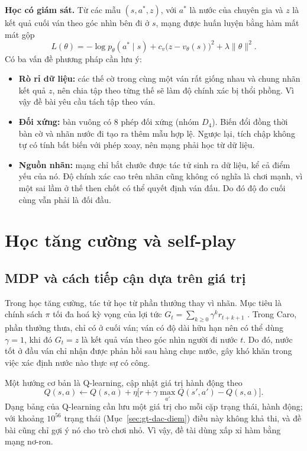 \textbf{Học có giám sát.} Từ các mẫu $(s, a^*, z)$, với $a^*$ là nước của chuyên gia và $z$ là kết quả cuối ván theo góc nhìn bên đi ở $s$, mạng được huấn luyện bằng hàm mất mát gộp
\begin{equation}
  L(\theta) = -\log p_\theta(a^* \mid s) + c_v \big( z - v_\theta(s) \big)^2 + \lambda \| \theta \|^2.
  \label{eq:sl-loss}
\end{equation}
Có ba vấn đề phương pháp cần lưu ý:
\begin{itemize}
  \item \textbf{Rò rỉ dữ liệu:} các thế cờ trong cùng một ván rất giống nhau và chung nhãn kết quả $z$, nên chia tập theo từng thế sẽ làm độ chính xác bị thổi phồng. Vì vậy đề bài yêu cầu tách tập theo ván.
  \item \textbf{Đối xứng:} bàn vuông có 8 phép đối xứng (nhóm $D_4$). Biến đổi đồng thời bàn cờ và nhãn nước đi tạo ra thêm mẫu hợp lệ. Ngược lại, tích chập không tự có tính bất biến với phép xoay, nên mạng phải học từ dữ liệu.
  \item \textbf{Nguồn nhãn:} mạng chỉ bắt chước được tác tử sinh ra dữ liệu, kể cả điểm yếu của nó. Độ chính xác cao trên nhãn cũng không có nghĩa là chơi mạnh, vì một sai lầm ở thế then chốt có thể quyết định ván đấu. Do đó độ đo cuối cùng vẫn phải là đối đầu.
\end{itemize}

\section{Học tăng cường và self-play}
\label{sec:lt-self-play}

\subsection{MDP và cách tiếp cận dựa trên giá trị}
Trong học tăng cường, tác tử học từ phần thưởng thay vì nhãn. Mục tiêu là chính sách $\pi$ tối đa hoá kỳ vọng của lợi tức $G_t = \sum_{k \ge 0} \gamma^k r_{t+k+1}$ \cite{sutton2018rl}. Trong Caro, phần thưởng thưa, chỉ có ở cuối ván; ván có độ dài hữu hạn nên có thể dùng $\gamma = 1$, khi đó $G_t = z$ là kết quả ván theo góc nhìn người đi nước $t$. Do đó, nước tốt ở đầu ván chỉ nhận được phản hồi sau hàng chục nước, gây khó khăn trong việc xác định nước nào thực sự có công.

Một hướng cơ bản là Q-learning, cập nhật giá trị hành động theo
\begin{equation}
  Q(s, a) \leftarrow Q(s, a) + \eta \big[ r + \gamma \max_{a'} Q(s', a') - Q(s, a) \big].
\end{equation}
Dạng bảng của Q-learning cần lưu một giá trị cho mỗi cặp trạng thái, hành động; với khoảng $10^{56}$ trạng thái (Mục~\ref{sec:gt-dac-diem}) điều này không khả thi, và đề bài cũng chỉ gợi ý nó cho trò chơi nhỏ. Vì vậy, đề tài dùng xấp xỉ hàm bằng mạng nơ-ron.

